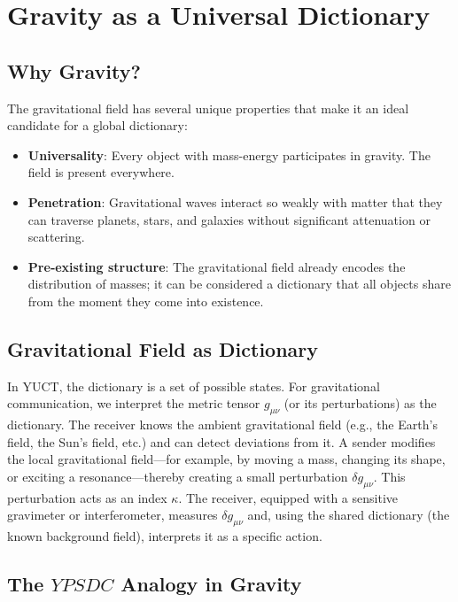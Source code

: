 \documentclass[12pt,a4paper]{article}
\newcommand{\YPSDC}{YPSDC}
\begin{document}
	\section{Gravity as a Universal Dictionary}
	\label{sec:gravity}
	
	\subsection{Why Gravity?}
	
	The gravitational field has several unique properties that make it an ideal candidate for a global dictionary:
	\begin{itemize}
		\item \textbf{Universality}: Every object with mass-energy participates in gravity. The field is present everywhere.
		\item \textbf{Penetration}: Gravitational waves interact so weakly with matter that they can traverse planets, stars, and galaxies without significant attenuation or scattering.
		\item \textbf{Pre‑existing structure}: The gravitational field already encodes the distribution of masses; it can be considered a dictionary that all objects share from the moment they come into existence.
	\end{itemize}
	
	\subsection{Gravitational Field as Dictionary}
	
	In YUCT, the dictionary is a set of possible states. For gravitational communication, we interpret the metric tensor \(g_{\mu\nu}\) (or its perturbations) as the dictionary. The receiver knows the ambient gravitational field (e.g., the Earth’s field, the Sun’s field, etc.) and can detect deviations from it. A sender modifies the local gravitational field—for example, by moving a mass, changing its shape, or exciting a resonance—thereby creating a small perturbation \(\delta g_{\mu\nu}\). This perturbation acts as an index \(\kappa\). The receiver, equipped with a sensitive gravimeter or interferometer, measures \(\delta g_{\mu\nu}\) and, using the shared dictionary (the known background field), interprets it as a specific action.
	
	\subsection{The \(\YPSDC\) Analogy in Gravity}
	
\end{document}
